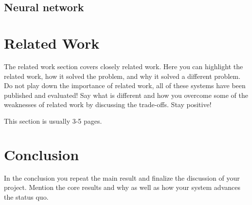 \documentclass[a4paper,11pt,oneside]{report}
\begin{document}
\section{Neural network}



\chapter{Related Work}

The related work section covers closely related work. Here you can highlight
the related work, how it solved the problem, and why it solved a different
problem. Do not play down the importance of related work, all of these
systems have been published and evaluated! Say what is different and how
you overcome some of the weaknesses of related work by discussing the 
trade-offs. Stay positive!

This section is usually 3-5 pages.


\chapter{Conclusion}

In the conclusion you repeat the main result and finalize the discussion of
your project. Mention the core results and why as well as how your system
advances the status quo.

\cleardoublepage
{}
{}
\printbibliography
\end{document}
